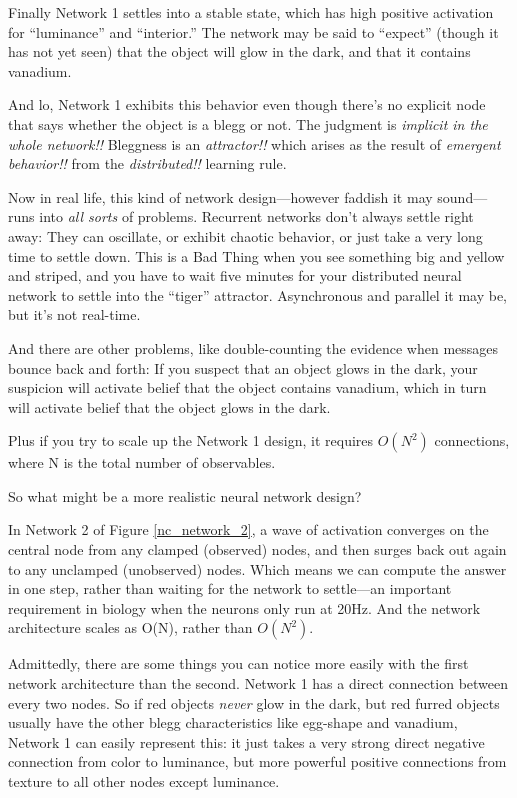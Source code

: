 {
 Finally Network 1 settles into a stable state, which has high
positive activation for
``luminance'' and
``interior.'' The network may be
said to ``expect'' (though it has
not yet seen) that the object will glow in the dark, and that it
contains vanadium.}

{
 And lo, Network 1 exhibits this behavior even though
there's no explicit node that says whether the object
is a blegg or not. The judgment is \textit{implicit in the whole
network!!} Bleggness is an \textit{attractor!!} which arises as the
result of \textit{emergent behavior!!} from the \textit{distributed!!}
learning rule.}

{
 Now in real life, this kind of network design---however faddish it
may sound---runs into \textit{all sorts} of problems. Recurrent
networks don't always settle right away: They can
oscillate, or exhibit chaotic behavior, or just take a very long time
to settle down. This is a Bad Thing when you see something big and
yellow and striped, and you have to wait five minutes for your
distributed neural network to settle into the
``tiger'' attractor. Asynchronous
and parallel it may be, but it's not real-time.}

{
 And there are other problems, like double-counting the evidence
when messages bounce back and forth: If you suspect that an object
glows in the dark, your suspicion will activate belief that the object
contains vanadium, which in turn will activate belief that the object
glows in the dark.}

{
 Plus if you try to scale up the Network 1 design, it requires
$O(N^{2})$ connections, where N is the total number of
observables.}

{
 So what might be a more realistic neural network design?}


{
 In Network 2 of Figure \ref{nc_network_2}, a wave of activation converges on
the central node from any clamped (observed) nodes, and then surges
back out again to any unclamped (unobserved) nodes. Which means we can
compute the answer in one step, rather than waiting for the network to
settle---an important requirement in biology when the neurons only run
at 20Hz. And the network architecture scales as O(N), rather than
$O(N^{2})$.}

{
 Admittedly, there are some things you can notice more easily with
the first network architecture than the second. Network 1 has a direct
connection between every two nodes. So if red objects \textit{never}
glow in the dark, but red furred objects usually have the other blegg
characteristics like egg-shape and vanadium, Network 1 can easily
represent this: it just takes a very strong direct negative connection
from color to luminance, but more powerful positive connections from
texture to all other nodes except luminance.}

